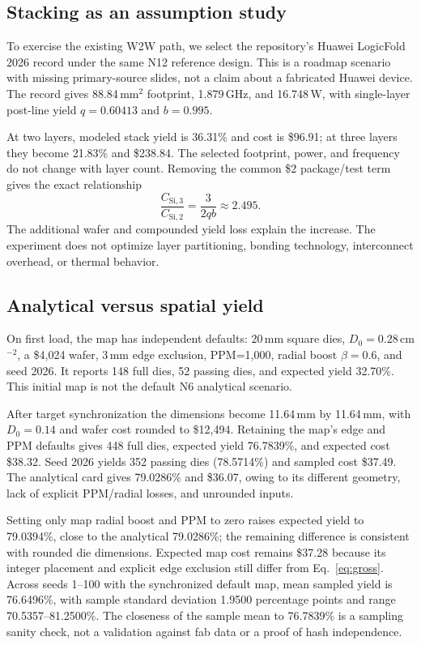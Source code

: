 \documentclass[11pt,a4paper]{article}
\begin{document}
\subsection{Stacking as an assumption study}
To exercise the existing W2W path, we select the repository's Huawei
LogicFold 2026 record under the same N12 reference design. This is a roadmap
scenario with missing primary-source slides, not a claim about a fabricated
Huawei device. The record gives 88.84\,mm$^2$ footprint, 1.879\,GHz, and
16.748\,W, with single-layer post-line yield $q=0.60413$ and
$b=0.995$.

At two layers, modeled stack yield is 36.31\% and cost is \$96.91;
at three layers they become 21.83\% and \$238.84. The selected footprint,
power, and frequency do not change with layer count. Removing the common
\$2 package/test term gives the exact relationship
\begin{equation}
\frac{C_{\mathrm{Si},3}}{C_{\mathrm{Si},2}}=
\frac{3}{2qb}\approx2.495.
\end{equation}
The additional wafer and compounded yield loss explain the increase.
The experiment does not optimize layer partitioning, bonding technology,
interconnect overhead, or thermal behavior.

\subsection{Analytical versus spatial yield}
On first load, the map has independent defaults: 20\,mm square dies,
$D_0=0.28$\,cm$^{-2}$, a \$4,024 wafer, 3\,mm edge exclusion,
PPM=1,000, radial boost $\beta=0.6$, and seed 2026. It reports 148 full
dies, 52 passing dies, and expected yield 32.70\%. This initial map is
not the default N6 analytical scenario.

After target synchronization the dimensions become 11.64\,mm by
11.64\,mm, with $D_0=0.14$ and wafer cost rounded to \$12,494. Retaining
the map's edge and PPM defaults gives 448 full dies, expected yield
76.7839\%, and expected cost \$38.32. Seed 2026 yields 352 passing
dies (78.5714\%) and sampled cost \$37.49. The analytical card gives
79.0286\% and \$36.07, owing to its different geometry, lack of explicit
PPM/radial losses, and unrounded inputs.

Setting only map radial boost and PPM to zero raises expected yield to
79.0394\%, close to the analytical 79.0286\%; the remaining difference is
consistent with rounded die dimensions. Expected map cost remains \$37.28
because its integer placement and explicit edge exclusion still differ
from Eq.~\ref{eq:gross}. Across seeds 1--100 with the synchronized default
map, mean sampled yield is 76.6496\%, with sample standard deviation
1.9500 percentage points and range 70.5357--81.2500\%. The closeness of
the sample mean to 76.7839\% is a sampling sanity check, not a validation
against fab data or a proof of hash independence.
\end{document}
